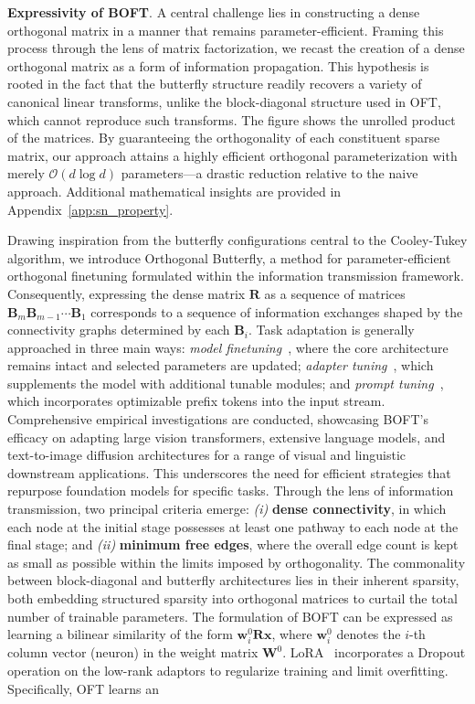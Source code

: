 \textbf{Expressivity of BOFT}. A central challenge lies in constructing a dense orthogonal matrix in a manner that remains parameter-efficient. Framing this process through the lens of matrix factorization, we recast the creation of a dense orthogonal matrix as a form of information propagation. This hypothesis is rooted in the fact that the butterfly structure readily recovers a variety of canonical linear transforms, unlike the block-diagonal structure used in OFT, which cannot reproduce such transforms. The figure shows the unrolled product of the matrices. By guaranteeing the orthogonality of each constituent sparse matrix, our approach attains a highly efficient orthogonal parameterization with merely $\mathcal{O}(d\log d)$ parameters—a drastic reduction relative to the naive approach. Additional mathematical insights are provided in Appendix~\ref{app:sn_property}. \item Drawing inspiration from the butterfly configurations central to the Cooley-Tukey algorithm, we introduce Orthogonal Butterfly, a method for parameter-efficient orthogonal finetuning formulated within the information transmission framework. Consequently, expressing the dense matrix $\bm{R}$ as a sequence of matrices $\bm{B}_m\bm{B}_{m-1}\cdots\bm{B}_1$ corresponds to a sequence of information exchanges shaped by the connectivity graphs determined by each $\bm{B}_i$. Task adaptation is generally approached in three main ways: \emph{model finetuning}~\cite{hulora2022,zaken2022bitfit,guo2020parameter,raffel2020exploring,qiu2023controlling,zhang2022adaptive,chavan2023one}, where the core architecture remains intact and selected parameters are updated; \emph{adapter tuning}~\cite{rebuffi2017learning,houlsby2019parameter,pfeiffer2020adapterfusion,lin2020exploring,he2021towards}, which supplements the model with additional tunable modules; and \emph{prompt tuning}~\cite{li2021prefix,lester2021power}, which incorporates optimizable prefix tokens into the input stream. Comprehensive empirical investigations are conducted, showcasing BOFT’s efficacy on adapting large vision transformers, extensive language models, and text-to-image diffusion architectures for a range of visual and linguistic downstream applications. This underscores the need for efficient strategies that repurpose foundation models for specific tasks. Through the lens of information transmission, two principal criteria emerge: \emph{(i)} \textbf{dense connectivity}, in which each node at the initial stage possesses at least one pathway to each node at the final stage; and \emph{(ii)} \textbf{minimum free edges}, where the overall edge count is kept as small as possible within the limits imposed by orthogonality. The commonality between block-diagonal and butterfly architectures lies in their inherent sparsity, both embedding structured sparsity into orthogonal matrices to curtail the total number of trainable parameters. The formulation of BOFT can be expressed as learning a bilinear similarity of the form $\bm{w}^0_i\bm{R}\bm{x}$, where $\bm{w}^0_i$ denotes the $i$-th column vector (neuron) in the weight matrix $\bm{W}^0$. LoRA~\cite{hulora2022} incorporates a Dropout operation on the low-rank adaptors to regularize training and limit overfitting. Specifically, OFT learns an 